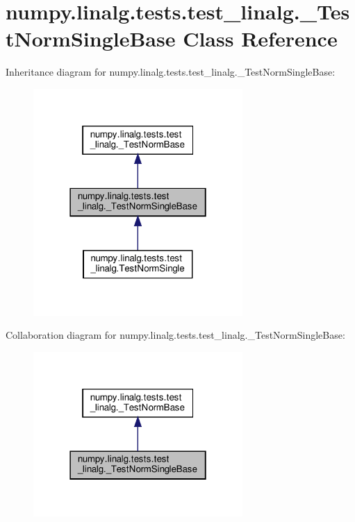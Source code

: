 \hypertarget{classnumpy_1_1linalg_1_1tests_1_1test__linalg_1_1__TestNormSingleBase}{}\section{numpy.\+linalg.\+tests.\+test\+\_\+linalg.\+\_\+\+Test\+Norm\+Single\+Base Class Reference}
\label{classnumpy_1_1linalg_1_1tests_1_1test__linalg_1_1__TestNormSingleBase}


Inheritance diagram for numpy.\+linalg.\+tests.\+test\+\_\+linalg.\+\_\+\+Test\+Norm\+Single\+Base\+:
\nopagebreak
\begin{figure}[H]
\begin{center}
\leavevmode
\includegraphics[width=226pt]{classnumpy_1_1linalg_1_1tests_1_1test__linalg_1_1__TestNormSingleBase__inherit__graph}
\end{center}
\end{figure}


Collaboration diagram for numpy.\+linalg.\+tests.\+test\+\_\+linalg.\+\_\+\+Test\+Norm\+Single\+Base\+:
\nopagebreak
\begin{figure}[H]
\begin{center}
\leavevmode
\includegraphics[width=226pt]{classnumpy_1_1linalg_1_1tests_1_1test__linalg_1_1__TestNormSingleBase__coll__graph}
\end{center}
\end{figure}
